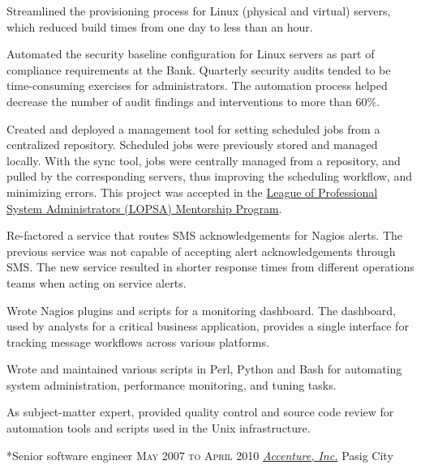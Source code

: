 \documentclass[10pt, a4paper, final]{article}
\begin{document}
\begin{section}
\begin{subsection}
\begin{compactitem}
      \item Streamlined the provisioning process for Linux (physical and virtual) servers, which reduced build times from one day to less than an hour.
      \item Automated the security baseline configuration for Linux servers as part of compliance requirements at the Bank. Quarterly security audits tended to be time-consuming exercises for administrators. The automation process helped decrease the number of audit findings and interventions to more than 60\%.
      \item Created and deployed a management tool for setting scheduled jobs from a centralized repository. Scheduled jobs were previously stored and managed locally. With the sync tool, jobs were centrally managed from a repository, and pulled by the corresponding servers, thus improving the scheduling workflow, and minimizing errors. This project was accepted in the \href{https://lopsa.org/mentor}{League of Professional System Administrators (LOPSA) Mentorship Program}.
      \item Re-factored a service that routes SMS acknowledgements for Nagios alerts. The previous service was not capable of accepting alert acknowledgements through SMS. The new service resulted in shorter response times from different operations teams when acting on service alerts.
      \item Wrote Nagios plugins and scripts for a monitoring dashboard. The dashboard, used by analysts for a critical business application, provides a single interface for tracking message workflows across various platforms.
      \item Wrote and maintained various scripts in Perl, Python and Bash for automating system administration, performance monitoring, and tuning tasks.
      \item As subject-matter expert, provided quality control and source code review for automation tools and scripts used in the Unix infrastructure.
      
    \end{compactitem}
  \end{subsection}
  \vspace{1.5em}

  \begin{subsection}*{Senior software engineer \hfill\textsc{May 2007 to April 2010}}
    \href{http://www.accenture.com}{\textit{Accenture, Inc.}} \hfill Pasig City
    \vspace{1em}


\end{subsection}
\end{section}
\end{document}
